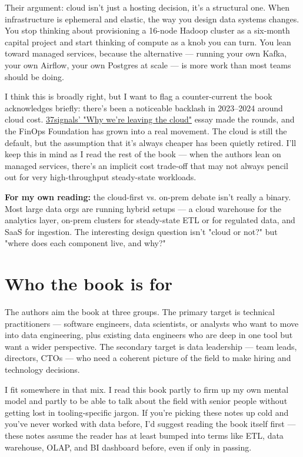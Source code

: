 Their argument: cloud isn't just a hosting decision, it's a structural one. When infrastructure is ephemeral and elastic, the way you design data systems changes. You stop thinking about provisioning a 16-node Hadoop cluster as a six-month capital project and start thinking of compute as a knob you can turn. You lean toward managed services, because the alternative — running your own Kafka, your own Airflow, your own Postgres at scale — is more work than most teams should be doing.

I think this is broadly right, but I want to flag a counter-current the book acknowledges briefly: there's been a noticeable backlash in 2023--2024 around cloud cost. \href{https://world.hey.com/dhh/why-we-re-leaving-the-cloud-654b47e0}{37signals' "Why we're leaving the cloud"} essay made the rounds, and the FinOps Foundation has grown into a real movement. The cloud is still the default, but the assumption that it's always cheaper has been quietly retired. I'll keep this in mind as I read the rest of the book — when the authors lean on managed services, there's an implicit cost trade-off that may not always pencil out for very high-throughput steady-state workloads.

\begin{notebox}
\textbf{For my own reading:} the cloud-first vs. on-prem debate isn't really a binary. Most large data orgs are running hybrid setups — a cloud warehouse for the analytics layer, on-prem clusters for steady-state ETL or for regulated data, and SaaS for ingestion. The interesting design question isn't "cloud or not?" but "where does each component live, and why?"
\end{notebox}

\section*{Who the book is for}

The authors aim the book at three groups. The primary target is technical practitioners — software engineers, data scientists, or analysts who want to move into data engineering, plus existing data engineers who are deep in one tool but want a wider perspective. The secondary target is data leadership — team leads, directors, CTOs — who need a coherent picture of the field to make hiring and technology decisions.

I fit somewhere in that mix. I read this book partly to firm up my own mental model and partly to be able to talk about the field with senior people without getting lost in tooling-specific jargon. If you're picking these notes up cold and you've never worked with data before, I'd suggest reading the book itself first — these notes assume the reader has at least bumped into terms like ETL, data warehouse, OLAP, and BI dashboard before, even if only in passing.

